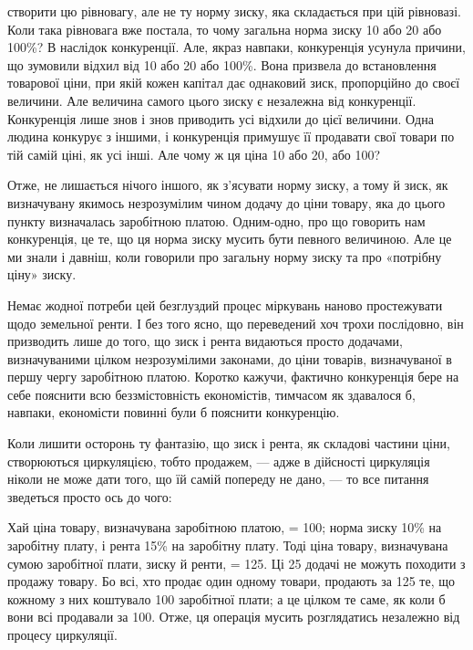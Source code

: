 створити цю рівновагу, але не ту норму зиску, яка складається при цій рівновазі.
Коли така рівновага вже постала, то чому загальна норма зиску 10 або
20 або 100\%? В наслідок конкуренції. Але, якраз навпаки, конкуренція усунула
причини, що зумовили відхил від 10 або 20 або 100\%. Вона призвела
до встановлення товарової ціни, при якій кожен капітал дає однаковий зиск,
пропорційно до своєї величини. Але величина самого цього зиску є незалежна
від конкуренції. Конкуренція лише знов і знов приводить усі відхили до цієї
величини. Одна людина конкурує з іншими, і конкуренція примушує її продавати
свої товари по тій самій ціні, як усі інші. Але чому ж ця ціна 10 або
20, або 100?

Отже, не лишається нічого іншого, як з’ясувати норму зиску, а тому й
зиск, як визначувану якимось незрозумілим чином додачу до ціни товару, яка
до цього пункту визначалась заробітною платою. Одним-одно, про що говорить
нам конкуренція, це те, що ця норма зиску мусить бути певного величиною.
Але це ми знали і давніш, коли говорили про загальну норму зиску та про
«потрібну ціну» зиску.

Немає жодної потреби цей безглуздий процес міркувань наново простежувати
щодо земельної ренти. І без того ясно, що переведений хоч трохи послідовно,
він призводить лише до того, що зиск і рента видаються просто додачами,
визначуваними цілком незрозумілими законами, до ціни товарів, визначуваної
в першу чергу заробітною платою. Коротко кажучи, фактично конкуренція
бере на себе пояснити всю беззмістовність економістів, тимчасом як здавалося б,
навпаки, економісти повинні були б пояснити конкуренцію.

Коли лишити осторонь ту фантазію, що зиск і рента, як складові частини
ціни, створюються циркуляцією, тобто продажем, — адже в дійсності циркуляція
ніколи не може дати того, що їй самій попереду не дано, — то все питання зведеться
просто ось до чого:

Хай ціна товару, визначувана заробітною платою, = 100; норма зиску
10\% на заробітну плату, і рента 15\% на заробітну плату. Тоді ціна товару,
визначувана сумою заробітної плати, зиску й ренти, = 125. Ці 25 додачі не
можуть походити з продажу товару. Бо всі, хто продає один одному товари,
продають за 125 те, що кожному з них коштувало 100 заробітної плати; а це
цілком те саме, як коли б вони всі продавали за 100. Отже, ця операція мусить
розглядатись незалежно від процесу циркуляції.

